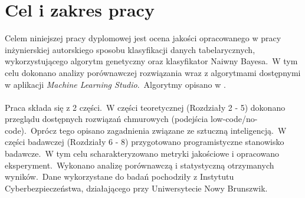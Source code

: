 \section{Cel i zakres pracy}
Celem niniejszej pracy dyplomowej jest ocena jakości opracowanego w pracy inżynierskiej autorskiego sposobu klasyfikacji danych tabelarycznych, wykorzystującego algorytm genetyczny oraz klasyfikator Naiwny Bayesa.\ W tym celu dokonano analizy porównawczej rozwiązania wraz z algorytmami dostępnymi w aplikacji \textit{Machine Learning Studio}.\ Algorytmy opisano w .
\\ \\
Praca składa się z 2 części.\ W części teoretycznej (Rozdziały 2 - 5) dokonano przeglądu dostępnych rozwiązań chmurowych (podejścia low-code/no-code).\ Oprócz tego opisano zagadnienia związane ze sztuczną inteligencją.\ W części badawczej (Rozdziały 6 - 8) przygotowano programistyczne stanowisko badawcze.\ W tym celu scharakteryzowano metryki jakościowe i opracowano eksperyment.\ Wykonano analizę porównawczą i statystyczną otrzymanych wyników.\ Dane wykorzystane do badań pochodziły z Instytutu Cyberbezpieczeństwa, działającego przy Uniwersytecie Nowy Brunszwik.

